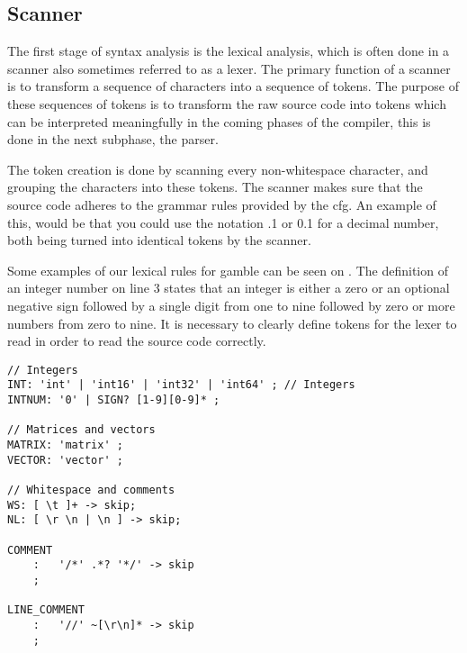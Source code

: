 \subsection*{Scanner}
The first stage of syntax analysis is the lexical analysis, which is often done in a scanner also sometimes referred to as a lexer.
The primary function of a scanner is to transform a sequence of characters into a sequence of tokens.
The purpose of these sequences of tokens is to transform the raw source code into tokens which can be interpreted meaningfully in the coming phases of the compiler, this is done in the next subphase, the parser.
  
The token creation is done by scanning every non-whitespace character, and grouping the characters into these tokens.
The scanner makes sure that the source code adheres to the grammar rules provided by the \acrshort{cfg}.
An example of this, would be that you could use the notation .1 or 0.1 for a decimal number, both being turned into identical tokens by the scanner.

Some examples of our lexical rules for \gls{gamble} can be seen on .
The definition of an integer number on line 3 states that an integer is either a zero or an optional negative sign followed by a single digit from one to nine followed by zero or more numbers from zero to nine.
It is necessary to clearly define tokens for the lexer to read in order to read the source code correctly. \citep{Crafting_book}

\begin{lstlisting}[caption=Example of our lexer rules for \gls{gamble},frame=tlrb,label={lst:token}]
// Integers
INT: 'int' | 'int16' | 'int32' | 'int64' ; // Integers
INTNUM: '0' | SIGN? [1-9][0-9]* ;

// Matrices and vectors
MATRIX: 'matrix' ;
VECTOR: 'vector' ;

// Whitespace and comments
WS: [ \t ]+ -> skip;
NL: [ \r \n | \n ] -> skip;

COMMENT
    :   '/*' .*? '*/' -> skip
    ;

LINE_COMMENT
    :   '//' ~[\r\n]* -> skip
    ;
\end{lstlisting} 
